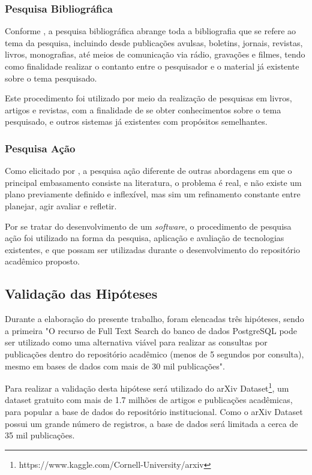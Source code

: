 \subsubsection{Pesquisa Bibliográfica}

Conforme \citep[p. 183]{LAKATOS2003:metodologia}, a pesquisa bibliográfica
abrange toda a bibliografia que se refere ao tema da pesquisa,
incluindo desde publicações avulsas, boletins, jornais, revistas,
livros, monografias, até meios de comunicação via rádio,
gravações e filmes, tendo como finalidade realizar o contanto
entre o pesquisador e o material já existente sobre o tema pesquisado.

Este procedimento foi utilizado por meio da realização de pesquisas
em livros, artigos e revistas, com a finalidade de se obter
conhecimentos sobre o tema pesquisado, e outros sistemas
já existentes com propósitos semelhantes.

\subsubsection{Pesquisa Ação}

Como elicitado por \citep[p. 45]{LOVATO:metodologia}, a pesquisa ação
diferente de outras abordagens em que o principal
embasamento consiste na literatura, o problema é real, e não existe
um plano previamente definido e inflexível, mas sim um refinamento
constante entre planejar, agir avaliar e refletir.

Por se tratar do desenvolvimento de um \emph{software}, o procedimento
de pesquisa ação foi utilizado na forma da pesquisa,
aplicação e avaliação de tecnologias existentes, e que possam
ser utilizadas durante o desenvolvimento do repositório
acadêmico proposto.

\subsection{Validação das Hipóteses}

Durante a elaboração do presente trabalho, foram elencadas
três hipóteses, sendo a  primeira "O recurso de Full Text
Search do banco de dados PostgreSQL pode ser utilizado como
uma alternativa viável para realizar as consultas por publicações
dentro do repositório acadêmico (menos de 5 segundos por consulta),
mesmo em bases de dados com mais de 30 mil publicações".

Para realizar a validação desta hipótese será utilizado do
arXiv Dataset\footnote{https://www.kaggle.com/Cornell-University/arxiv},
um dataset gratuito com mais de 1.7 milhões de artigos e publicações acadêmicas,
para popular a base de dados do repositório institucional. Como o arXiv Dataset
possui um grande número de registros, a base de dados será limitada
a cerca de 35 mil publicações.

